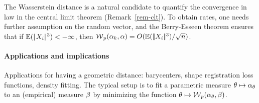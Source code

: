 \begin{rem}
The Wasserstein distance is a natural candidate to quantify the convergence in law in the central limit theorem (Remark~\ref{rem-clt}). To obtain rates, one needs further assumption on the random vector, and the Berry-Esseen theorem ensures that if $\mathbb{E}(|\!| X_i |\!|^3)<+\infty$, then $\operatorname{\mathcal{W}}_p(\alpha_k,\alpha) = O(\mathbb{E}(|\!| X_i |\!|^3)/\sqrt{n})$.
\end{rem}
 
 
\paragraph{Applications and implications}

Applications for having a geometric distance: barycenters, shape registration loss functions, density fitting.
%
The typical setup is to fit a parametric measure $\theta \mapsto \alpha_\theta$ to an (empirical) measure $\beta$ by minimizing the function $\theta \mapsto \operatorname{\mathcal{W}}_p(\alpha_\theta,\beta)$.



